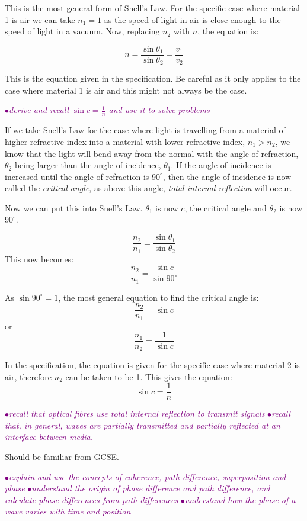 \documentclass[a4paper,11pt,twoside]{memoir}
\newcounter{spec}[chapter]
\newcommand{\spec}[1]{\Needspace{5\baselineskip}\textcolor{purple}{$\bullet$\hspace{0.5cm}\textit{#1}}}
\begin{document}
This is the most general form of Snell's Law. For the specific case where material 1 is air we can take $n_1 = 1$ as the speed of light in air is close enough to the speed of light in a vacuum. Now, replacing $n_2$ with $n$, the equation is:

\[ n = \frac{\sin{\theta_1}}{\sin{\theta_2}} = \frac{v_1}{v_2}\]

This is the equation given in the specification. Be careful as it only applies to the case where material 1 is air and this might not always be the case.

\spec{derive and recall $\sin{c} = \frac{1}{n}$ and use it to solve problems}

If we take Snell's Law for the case where light is travelling from a material of higher refractive index into a material with lower refractive index, $n_1 > n_2$, we know that the light will bend away from the normal with the angle of refraction, $\theta_2$ being larger than the angle of incidence, $\theta_1$. If the angle of incidence is increased until the angle of refraction is $90^{\circ}$, then the angle of incidence is now called the \emph{critical angle}, as above this angle, \emph{total internal reflection} will occur.

Now we can put this into Snell's Law. $\theta_1$ is now $c$, the critical angle and $\theta_2$ is now $90^{\circ}$.

$$\frac{n_2}{n_1} = \frac{\sin{\theta_1}}{\sin{\theta_2}}$$
This now becomes:
$$\frac{n_2}{n_1} = \frac{\sin{c}}{\sin{90^{\circ}}}$$

As $\sin{90^{\circ}} = 1$, the most general equation to find the critical angle is:
$$\frac{n_2}{n_1} = \sin{c}$$
or
$$\frac{n_1}{n_2} = \frac{1}{\sin{c}}$$

In the specification, the equation is given for the specific case where material 2 is air, therefore $n_2$ can be taken to be 1. This gives the equation:
$$\sin{c} = \frac{1}{n}$$

\spec{recall that optical fibres use total internal reflection to transmit signals}
\spec{recall that, in general, waves are partially transmitted and partially reflected at an interface between media.}

Should be familiar from GCSE.

\spec{explain and use the concepts of coherence, path difference, superposition and phase}
\spec{understand the origin of phase difference and path difference, and calculate phase differences from path differences}
\spec{understand how the phase of a wave varies with time and position}
\end{document}
